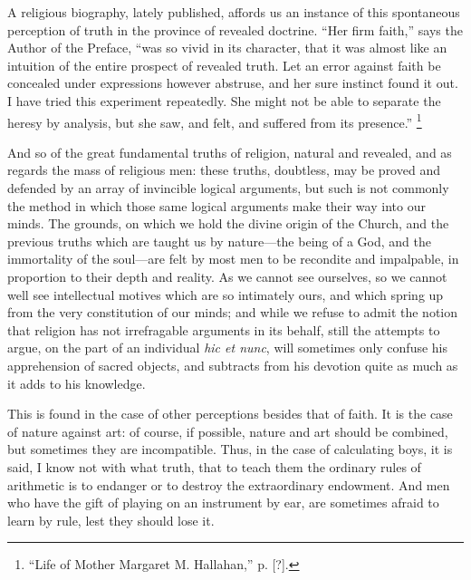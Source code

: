 A religious biography, lately published, affords us an instance of
this spontaneous perception of truth in the province of revealed
doctrine. ``Her firm faith,'' says the Author of the Preface,
``was so vivid in its character, that it was almost like an
intuition of the entire prospect of revealed truth. Let an error
against faith be concealed under expressions however abstruse, and her
sure instinct found it out. I have tried this experiment repeatedly.
She might not be able to separate the heresy by analysis, but she saw,
and felt, and suffered from its presence.'' \footnote{``Life of
Mother Margaret M. Hallahan,'' p. [?].}

And so of the great fundamental truths of religion, natural and
revealed, and as regards the mass of religious men: these truths,
doubtless, may be proved and defended by an array of invincible
logical arguments, but such is not commonly the method in which those
same logical arguments make their way into our minds. The grounds, on
which we hold the divine origin of the Church, and the previous truths
which are taught us by nature—the being of a God, and the
immortality of the soul—are felt by most men to be recondite and
impalpable, in proportion to their depth and reality. As we cannot see
ourselves, so we cannot well see intellectual motives which are so
intimately ours, and which spring up from the very constitution of our
minds; and while we refuse to admit the notion that religion has not
irrefragable arguments in its behalf, still the attempts to argue, on
the part of an individual \emph{hic et nunc}, will sometimes only
confuse his apprehension of sacred objects, and subtracts from his
devotion quite as much as it adds to his knowledge.

This is found in the case of other perceptions besides that of
faith. It is the case of nature against art: of course, if possible,
nature and art should be combined, but sometimes they are
incompatible. Thus, in the case of calculating boys, it is said, I
know not with what truth, that to teach them the ordinary rules of
arithmetic is to endanger or to destroy the extraordinary endowment.
And men who have the gift of playing on an instrument by ear, are
sometimes afraid to learn by rule, lest they should lose it.

